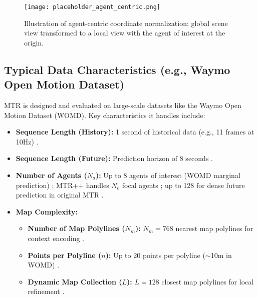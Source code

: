 \begin{figure}[h!]
    \centering
    \texttt{[image: placeholder\_agent\_centric.png]} %
    \caption{Illustration of agent-centric coordinate normalization: global scene view transformed to a local view with the agent of interest at the origin.}
    \label{fig:agent_centric}
\end{figure}

\subsection{Typical Data Characteristics (e.g., Waymo Open Motion Dataset)}
\label{subsec:data_characteristics}

MTR is designed and evaluated on large-scale datasets like the Waymo Open Motion Dataset (WOMD). Key characteristics it handles include:

\begin{itemize}
    \item \textbf{Sequence Length (History):} 1 second of historical data (e.g., 11 frames at 10Hz) \cite{WOMD2021}.
    \item \textbf{Sequence Length (Future):} Prediction horizon of 8 seconds \cite{WOMD2021}.
    \item \textbf{Number of Agents ($N_a$):} Up to 8 agents of interest (WOMD marginal prediction) \cite{WOMD2021}; MTR++ handles $N_o$ focal agents \cite{Shi2023MTRplusplus}; up to 128 for dense future prediction in original MTR \cite{Shi2022MTR}.
    \item \textbf{Map Complexity:}
    \begin{itemize}
        \item \textbf{Number of Map Polylines ($N_m$):} $N_m=768$ nearest map polylines for context encoding \cite{Shi2022MTR}.
        \item \textbf{Points per Polyline ($n$):} Up to 20 points per polyline ($\sim$10m in WOMD) \cite{Shi2022MTR_A}.
        \item \textbf{Dynamic Map Collection ($L$):} $L=128$ closest map polylines for local refinement \cite{Shi2022MTR, Shi2022MTR_A}.
    \end{itemize}
\end{itemize}

